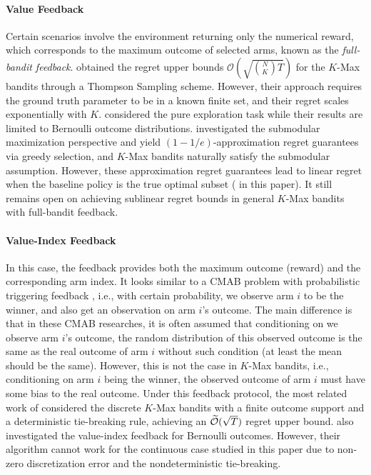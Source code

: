 \paragraph{Value Feedback} 
Certain scenarios involve the environment returning only the numerical reward, which corresponds to the maximum outcome of selected arms, known as the \textit{full-bandit feedback}. \citet{gopalan2014thompson} obtained the regret upper bounds $\mathcal{O}\left(\sqrt{\binom{N}{K}T}\right)$ for the $K$-Max bandits through a Thompson Sampling scheme. However, their approach requires the ground truth parameter to be in a known finite set, and their regret scales exponentially with $K$.
\citet{simchowitz2016best} considered the pure exploration task while their results are limited to Bernoulli outcome distributions.
\citet{streeter2008online,yue2011linear,nie2022explore,fourati2024combinatorial} investigated the submodular maximization perspective and yield $(1-1/e)$-approximation regret guarantees via greedy selection, and $K$-Max bandits naturally satisfy the submodular assumption.
%
However, these approximation regret guarantees lead to linear regret when the baseline policy is the true optimal subset
( in this paper). 
It still remains open on achieving sublinear regret bounds in general $K$-Max bandits with full-bandit feedback.

\paragraph{Value-Index Feedback}
In this case, the feedback provides both the maximum outcome (reward) and the corresponding arm index. 
%
It looks similar to a CMAB problem with probabilistic triggering feedback \citep{wang2017improving,liu2023contextual,liu2024combinatorial}, i.e., with certain probability, we observe arm $i$ to be the winner, and also get an observation on arm $i$'s outcome. 
%
The main difference is that in these CMAB researches, it is often assumed that conditioning on we observe arm $i$'s outcome, the random distribution of this observed outcome is the same as the real outcome of arm $i$ without such condition (at least the mean should be the same). 
%
However, this is not the case in $K$-Max bandits, i.e., conditioning on arm $i$ being the winner, the observed outcome of arm $i$ must have some bias to the real outcome.
%
Under this feedback protocol, the most related work of \citep{wang2023combinatorial} considered the discrete $K$-Max bandits with a finite outcome support and a deterministic tie-breaking rule, achieving an $\widetilde{{\mathcal{O}}}(\sqrt{T})$ regret upper bound. 
\citet{simchowitz2016best} also investigated the value-index feedback for Bernoulli outcomes.
However, their algorithm cannot work for the continuous case studied in this paper due to non-zero discretization error and the nondeterministic tie-breaking.
%

